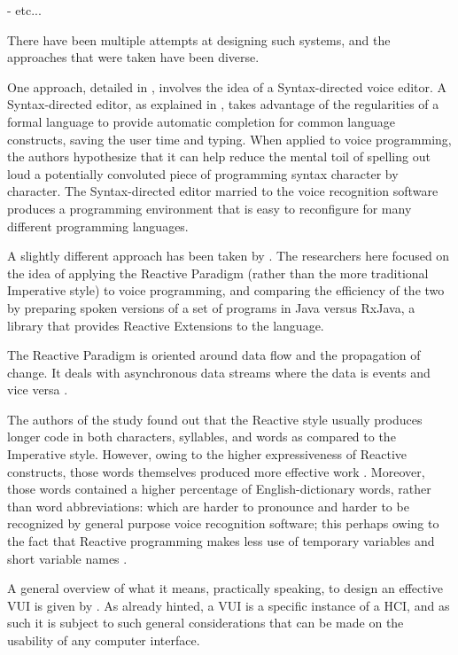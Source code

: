 - etc...

There have been multiple attempts at designing such systems, and the approaches that were taken have been diverse.

One approach, detailed in \cite{arnold2000programming}, involves the idea of a Syntax-directed voice editor. A Syntax-directed editor, as explained in \cite{arnold2000programming}, takes advantage of the regularities of a formal language to provide automatic completion for common language constructs, saving the user time and typing. When applied to voice programming, the authors hypothesize that it can help reduce the mental toil of spelling out loud a potentially convoluted piece of programming syntax character by character. The Syntax-directed editor married to the voice recognition software produces a programming environment that is easy to reconfigure for many different programming languages.

A slightly different approach has been taken by \cite{lagergren2021programming}. The researchers here focused on the idea of applying the Reactive Paradigm (rather than the more traditional Imperative style) to voice programming, and comparing the efficiency of the two by preparing spoken versions of a set of programs in Java versus RxJava, a library that provides Reactive Extensions to the language.

The Reactive Paradigm is oriented around data flow and the propagation of change. It deals with asynchronous data streams where the data is events and vice versa \cite{lagergren2021programming}.

The authors of the study found out that the Reactive style usually produces longer code in both characters, syllables, and words as compared to the Imperative style. However, owing to the higher expressiveness of Reactive constructs, those words themselves produced more effective work \cite{lagergren2021programming}. Moreover, those words contained a higher percentage of English-dictionary words, rather than word abbreviations: which are harder to pronounce and harder to be recognized by general purpose voice recognition software; this perhaps owing to the fact that Reactive programming makes less use of temporary variables and short variable names \cite{lagergren2021programming}.

A general overview of what it means, practically speaking, to design an effective VUI is given by \cite{farinazzo2010empirical}. As already hinted, a VUI is a specific instance of a HCI, and as such it is subject to such general considerations that can be made on the usability of any computer interface.

